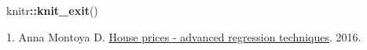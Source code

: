 \documentclass[
]{article}
\newenvironment{Shaded}{\begin{snugshade}}{\end{snugshade}}
\newcommand{\FunctionTok}[1]{\textcolor[rgb]{0.13,0.29,0.53}{\textbf{#1}}}
\newcommand{\NormalTok}[1]{#1}
\newcommand{\SpecialCharTok}[1]{\textcolor[rgb]{0.81,0.36,0.00}{\textbf{#1}}}
\newlength{\cslhangindent}
\newenvironment{CSLReferences}[2] %
 {\begin{list}{}{%
  \setlength{\itemindent}{0pt}
  \setlength{\leftmargin}{0pt}
  \setlength{\parsep}{0pt}
  \ifodd #1
   \setlength{\leftmargin}{\cslhangindent}
   \setlength{\itemindent}{-1\cslhangindent}
  \fi
  \setlength{\itemsep}{#2\baselineskip}}}
 {\end{list}}
\begin{document}
\begin{Shaded}
\begin{Highlighting}[]
\NormalTok{knitr}\SpecialCharTok{::}\FunctionTok{knit\_exit}\NormalTok{()}
\end{Highlighting}
\end{Shaded}

\label{refs}
\begin{CSLReferences}{0}{1}
1. Anna Montoya D.
\href{https://kaggle.com/competitions/house-prices-advanced-regression-techniques}{House
prices - advanced regression techniques}. 2016.

\end{CSLReferences}
\end{document}
